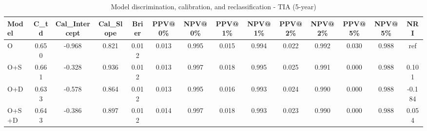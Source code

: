 \begin{table}[htbp]
\centering
\small
\caption{Model discrimination, calibration, and reclassification - TIA (5-year)}
\label{tab:perf_tia_5y}
\begin{tabular}{lccccccccccccc}
\toprule
Model & C\_td & Cal\_Intercept & Cal\_Slope & Brier & PPV@0\% & NPV@0\% & PPV@1\% & NPV@1\% & PPV@2\% & NPV@2\% & PPV@5\% & NPV@5\% & NRI \\
\midrule
O & 0.650 & -0.968 & 0.821 & 0.012 & 0.013 & 0.995 & 0.015 & 0.994 & 0.022 & 0.992 & 0.030 & 0.988 & ref \\
O+S & 0.661 & -0.328 & 0.936 & 0.012 & 0.013 & 0.997 & 0.018 & 0.995 & 0.025 & 0.991 & 0.000 & 0.988 & 0.101 \\
O+D & 0.633 & -0.578 & 0.864 & 0.012 & 0.013 & 0.995 & 0.016 & 0.993 & 0.024 & 0.990 & 0.000 & 0.988 & -0.184 \\
O+S+D & 0.643 & -0.386 & 0.897 & 0.012 & 0.014 & 0.997 & 0.018 & 0.993 & 0.023 & 0.990 & 0.000 & 0.988 & 0.054 \\
\bottomrule
\end{tabular}
\end{table}